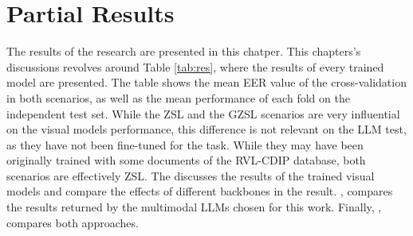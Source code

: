 \section{Partial Results}
\label{sec:results}

The results of the research are presented in this chatper. This chapters's discussions revolves around Table \ref{tab:res}, where the results of every trained model are presented. The table shows the mean EER value of the cross-validation in both scenarios, as well as the mean performance of each fold on the independent test set. While the \gls{ZSL} and the \gls{GZSL} scenarios are very influential on the visual models performance, this difference is not relevant on the \gls{LLM} test, as they have not been fine-tuned for the task. While they may have been originally trained with some documents of the RVL-CDIP database, both scenarios are effectively \gls{ZSL}. The  discusses the results of the trained visual models and compare the effects of different backbones in the result. , compares the results returned by the multimodal \glspl{LLM} chosen for this work. Finally, , compares both approaches.

